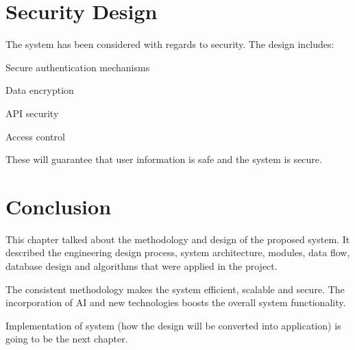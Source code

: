 \section{Security Design}

The system has been considered with regards to security. The design includes:

Secure authentication mechanisms

Data encryption

API security

Access control

These will guarantee that user information is safe and the system is secure.

\section{Conclusion}

This chapter talked about the methodology and design of the proposed system. It described the engineering design process, system architecture, modules, data flow, database design and algorithms that were applied in the project.

The consistent methodology makes the system efficient, scalable and secure. The incorporation of AI and new technologies boosts the overall system functionality.

Implementation of system (how the design will be converted into application) is going to be the next chapter.
